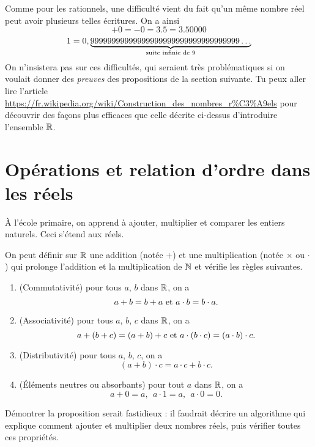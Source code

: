 Comme pour les rationnels, une difficulté vient du fait qu'un même nombre réel peut avoir plusieurs telles écritures. On a ainsi
\[ +0 = -0 = 3.5 = 3.50000 \] %
\[ 1 = 0,\underbrace{99999999999999999999999999999999999\dots}_{\textnormal{suite infinie de }9} \]
On n'insistera pas sur ces difficultés, qui seraient très problématiques si on voulait donner des \emph{preuves} des propositions de la section suivante. Tu peux aller lire l'article 
\url{https://fr.wikipedia.org/wiki/Construction_des_nombres_r%C3%A9els}
pour découvrir des façons plus efficaces que celle décrite ci-dessus d'introduire l'ensemble $\mathbb{R}$.

\section{Opérations et relation d'ordre dans les réels}

\`A l'école primaire, on apprend à ajouter, multiplier et comparer les entiers naturels. Ceci s'étend aux réels.

\begin{graybox}
	\begin{proposition}
		On peut définir sur $\mathbb{R}$ une addition (notée $+$) et une multiplication (notée $\times$ ou $\cdot$) qui prolonge l'addition et la multiplication de $\mathbb{N}$ et vérifie les règles suivantes.
		\begin{enumerate}
			\item (Commutativité) pour tous $a$, $b$ dans $\mathbb{R}$, on a
			\[ a+b=b+a \textnormal{ et } a \cdot b =b \cdot a.\]
			\item (Associativité) pour tous $a$, $b$, $c$ dans $\mathbb{R}$, on a
			\[ a+(b+c) = (a+b)+c \textnormal{ et } a \cdot (b \cdot c) = (a \cdot b) \cdot c .\]
			\item (Distributivité) pour tous $a$, $b$, $c$, on a
			\[ (a+b) \cdot c = a \cdot c + b \cdot c .\]
			\item (Éléments neutres ou absorbants) pour tout $a$ dans $\mathbb{R}$, on a
			\[ a+0 = a , \ \ a \cdot 1 =a , \ \ a \cdot 0 =0 .\]
		\end{enumerate}
	\end{proposition}
\end{graybox}


Démontrer la proposition serait fastidieux : il faudrait décrire un algorithme qui explique comment ajouter et multiplier deux nombres réels, puis vérifier toutes ces propriétés.


